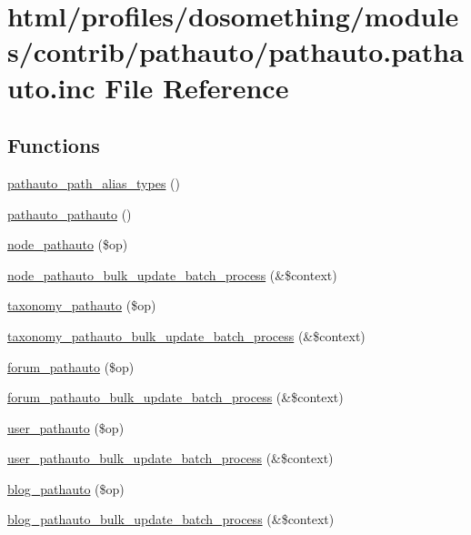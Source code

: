 \hypertarget{pathauto_8pathauto_8inc}{
\section{html/profiles/dosomething/modules/contrib/pathauto/pathauto.pathauto.inc File Reference}
\label{pathauto_8pathauto_8inc}
}
\subsection*{Functions}
\begin{DoxyCompactItemize}
\item 
\hyperlink{pathauto_8pathauto_8inc_aec760cc2879a4d3c483ba9417a582a2e}{pathauto\_\-path\_\-alias\_\-types} ()
\item 
\hyperlink{pathauto_8pathauto_8inc_a23d135d372c98c88372883e32e10d16a}{pathauto\_\-pathauto} ()
\item 
\hyperlink{pathauto_8pathauto_8inc_a2781dd6166a94526e682f5ace0e19635}{node\_\-pathauto} (\$op)
\item 
\hyperlink{pathauto_8pathauto_8inc_a41b1fb468254bd8dfe65936a52d137f2}{node\_\-pathauto\_\-bulk\_\-update\_\-batch\_\-process} (\&\$context)
\item 
\hyperlink{pathauto_8pathauto_8inc_a80b05ba65dfad90d0c849673546736a1}{taxonomy\_\-pathauto} (\$op)
\item 
\hyperlink{pathauto_8pathauto_8inc_a4ec3b6632264545aac8916614811ca0d}{taxonomy\_\-pathauto\_\-bulk\_\-update\_\-batch\_\-process} (\&\$context)
\item 
\hyperlink{pathauto_8pathauto_8inc_ab34f02e44d4865b507fb2bc21804091e}{forum\_\-pathauto} (\$op)
\item 
\hyperlink{pathauto_8pathauto_8inc_a523c81c744995116b6a4fb7a3691bd54}{forum\_\-pathauto\_\-bulk\_\-update\_\-batch\_\-process} (\&\$context)
\item 
\hyperlink{pathauto_8pathauto_8inc_a08bb0b4fe74c74a05ee0e56e7e9b8636}{user\_\-pathauto} (\$op)
\item 
\hyperlink{pathauto_8pathauto_8inc_a7d144c0223b223f5c2ade27c7e5677ed}{user\_\-pathauto\_\-bulk\_\-update\_\-batch\_\-process} (\&\$context)
\item 
\hyperlink{pathauto_8pathauto_8inc_a8c4e491dda09629f0e84dbd56da0570b}{blog\_\-pathauto} (\$op)
\item 
\hyperlink{pathauto_8pathauto_8inc_a946da68e6d428949901ffa18dc853183}{blog\_\-pathauto\_\-bulk\_\-update\_\-batch\_\-process} (\&\$context)
\end{DoxyCompactItemize}


